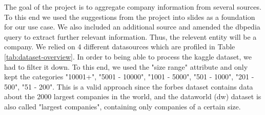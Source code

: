 \documentclass[11pt,titlepage,oneside,openany]{article}
\begin{document}
The goal of the project is to aggregate company information from several sources. To this end we used the suggestions from the project into slides as a foundation for our use case. We also included an additional source and amended the dbpedia query to extract further relevant information. Thus, the relevent entity will be a company.
We relied on 4 different datasources which are profiled in Table \ref{tab:dataset-overview}. In order to being able to process the kaggle dataset, we had to filter it down. To this end, we used the "size range" attribute and only kept the categories "10001+", "5001 - 10000", "1001 - 5000", "501 - 1000", "201 - 500", "51 - 200". This is a valid approach since the forbes dataset contains data about the 2000 largest companies in the world, and the dataworld (dw) dataset is also called "largest companies", containing only companies of a certain size.
\end{document}
